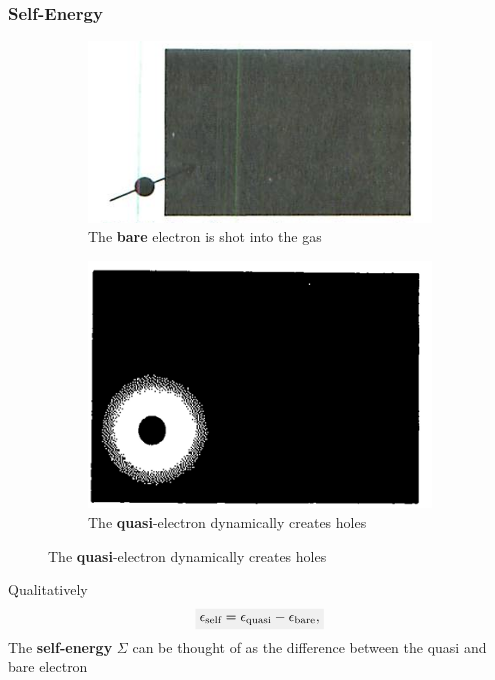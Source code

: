 \documentclass{beamer}
\newcommand{\highlight}[1]{\colorbox{caltechgray!10}{$\displaystyle#1$}}
\begin{document}
\begin{frame}
    \frametitle{\textcolor{caltechorange}{Self-Energy}}
    \begin{figure}
        \caption{Electron gas propagation\autocite{mattuck_guide_1992}}
        \begin{subfigure}{.4\textwidth}
            \centering
            \includegraphics[width=.8\linewidth]{shot.png}
            \caption{The \textbf{bare} electron is shot into the gas}
            \label{fig:shot}
        \end{subfigure}
        \begin{subfigure}{.4\textwidth}
            \centering
            \includegraphics[width=.8\linewidth]{clothing.png}
            \caption{The \textbf{quasi}-electron dynamically creates holes}
            \label{fig:clothing}
        \end{subfigure}
        \label{fig:propagates}
    \end{figure}
\pause
    Qualitatively 
    \begin{equation}
        \highlight{\epsilon_{\text{self}} = \epsilon_{\text{quasi}} - \epsilon_{\text{bare}},}
    \end{equation}
    The \textbf{self-energy} $\Sigma $ can be thought of as the difference between the quasi and bare electron
\end{frame}
\end{document}
